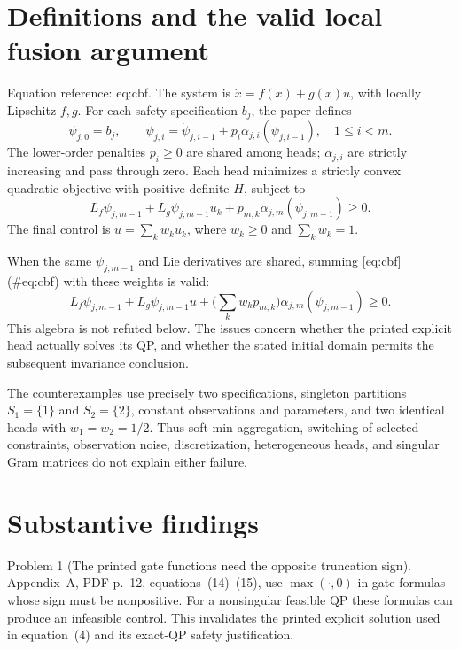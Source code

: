 \documentclass[10pt]{article}
\begin{document}
\section*{Definitions and the valid local fusion argument}
Equation reference: eq:cbf. The system is \(\dot x=f(x)+g(x)u\), with locally Lipschitz \(f,g\). For each safety specification \(b_j\), the paper defines \[\psi_{j,0}=b_j,\qquad
 \psi_{j,i}=\dot\psi_{j,i-1}+p_i\alpha_{j,i}(\psi_{j,i-1}),
 \quad 1\le i<m.\] The lower-order penalties \(p_i\ge0\) are shared among heads; \(\alpha_{j,i}\) are strictly increasing and pass through zero. Each head minimizes a strictly convex quadratic objective with positive-definite \(H\), subject to \[
 L_f\psi_{j,m-1}+L_g\psi_{j,m-1}u_k+
 p_{m,k}\alpha_{j,m}(\psi_{j,m-1})\ge0.\] The final control is \(u=\sum_k w_ku_k\), where \(w_k\ge0\) and \(\sum_k w_k=1\).\par
When the same \(\psi_{j,m-1}\) and Lie derivatives are shared, summing [eq:cbf] (\#eq:cbf) with these weights is valid: \[L_f\psi_{j,m-1}+L_g\psi_{j,m-1}u+
 \Big(\sum_k w_kp_{m,k}\Big)\alpha_{j,m}(\psi_{j,m-1})\ge0.\] This algebra is not refuted below. The issues concern whether the printed explicit head actually solves its QP, and whether the stated initial domain permits the subsequent invariance conclusion.\par
The counterexamples use precisely two specifications, singleton partitions \(S_1=\{1\}\) and \(S_2=\{2\}\), constant observations and parameters, and two identical heads with \(w_1=w_2=1/2\). Thus soft-min aggregation, switching of selected constraints, observation noise, discretization, heterogeneous heads, and singular Gram matrices do not explain either failure.\par
\section*{Substantive findings}
Problem 1 (The printed gate functions need the opposite truncation sign).  Appendix A, PDF p. 12, equations (14)–(15), use \(\max(\cdot,0)\) in gate formulas whose sign must be nonpositive. For a nonsingular feasible QP these formulas can produce an infeasible control. This invalidates the printed explicit solution used in equation (4) and its exact-QP safety justification.\par
\end{document}
